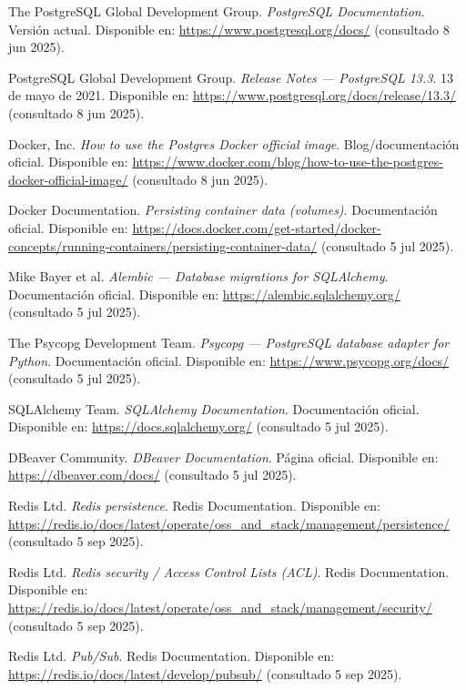 \documentclass[12pt, a4paper]{article}
\begin{document}
\begin{thebibliography}{9}
	The PostgreSQL Global Development Group.
	\textit{PostgreSQL Documentation}. Versión actual.
	Disponible en: \url{https://www.postgresql.org/docs/} (consultado 8 jun 2025).
	
	PostgreSQL Global Development Group.
	\textit{Release Notes — PostgreSQL 13.3}. 13 de mayo de 2021.
	Disponible en: \url{https://www.postgresql.org/docs/release/13.3/} (consultado 8 jun 2025).
	
	Docker, Inc.
	\textit{How to use the Postgres Docker official image}. Blog/documentación oficial.
	Disponible en: \url{https://www.docker.com/blog/how-to-use-the-postgres-docker-official-image/} (consultado 8 jun 2025).
	
	Docker Documentation.
	\textit{Persisting container data (volumes)}.  Documentación oficial.
	Disponible en: \url{https://docs.docker.com/get-started/docker-concepts/running-containers/persisting-container-data/} (consultado 5 jul 2025).
	
	Mike Bayer et al.
	\textit{Alembic — Database migrations for SQLAlchemy}. Documentación oficial.
	Disponible en: \url{https://alembic.sqlalchemy.org/} (consultado 5 jul 2025).
	
	The Psycopg Development Team.
	\textit{Psycopg — PostgreSQL database adapter for Python}. Documentación oficial.
	Disponible en: \url{https://www.psycopg.org/docs/} (consultado 5 jul 2025).
	
	SQLAlchemy Team.
	\textit{SQLAlchemy Documentation}. Documentación oficial.
	Disponible en: \url{https://docs.sqlalchemy.org/} (consultado 5 jul 2025).
	
	DBeaver Community.
	\textit{DBeaver Documentation}. Página oficial.
	Disponible en: \url{https://dbeaver.com/docs/} (consultado 5 jul 2025).

Redis Ltd.
\textit{Redis persistence}. Redis Documentation.
Disponible en: \url{https://redis.io/docs/latest/operate/oss_and_stack/management/persistence/} (consultado 5 sep 2025).

Redis Ltd.
\textit{Redis security / Access Control Lists (ACL)}. Redis Documentation.
Disponible en: \url{https://redis.io/docs/latest/operate/oss_and_stack/management/security/} (consultado 5 sep 2025).

Redis Ltd.
\textit{Pub/Sub}. Redis Documentation.
Disponible en: \url{https://redis.io/docs/latest/develop/pubsub/} (consultado 5 sep 2025).


\end{thebibliography}
\end{document}
